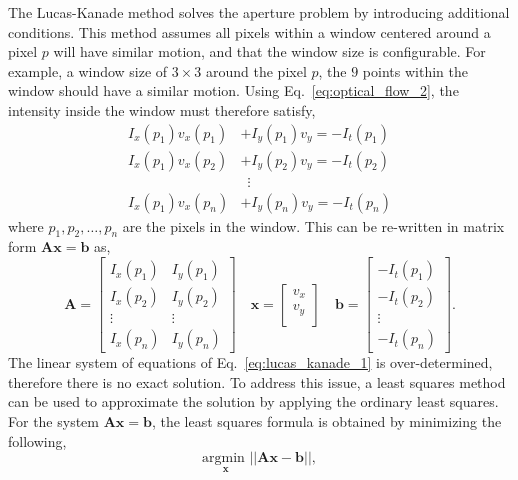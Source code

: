 The Lucas-Kanade method solves the aperture problem by introducing additional
conditions. This method assumes all pixels within a window centered around a
pixel $p$ will have similar motion, and that the window size is configurable.
For example, a window size of $3 \times 3$ around the pixel $p$, the $9$ points
within the window should have a similar motion. Using
Eq.~\ref{eq:optical_flow_2}, the intensity inside the window must therefore
satisfy,
%
\begin{align}
  I_{x}(p_1) v_{x}(p_1) &+ I_{y}(p_1) v_y = -I_{t}(p_1) \nonumber \\
  I_{x}(p_1) v_{x}(p_2) &+ I_{y}(p_2) v_y = -I_{t}(p_2) \nonumber \\
  & \enspace \vdots \nonumber \\
  I_{x}(p_1) v_{x}(p_n) &+ I_{y}(p_n) v_y = -I_{t}(p_n) \nonumber
\end{align}
%
where $p_{1}, p_{2} ,\dots , p_{n}$ are the pixels in the window. This can be
re-written in matrix form $\mathbf{A} \mathbf{x} = \mathbf{b}$ as,
%
\begin{equation}
  \label{eq:lucas_kanade_1}
    \mathbf{A} = \begin{bmatrix}
        I_{x}(p_{1}) & I_{y}(p_{1}) \\
        I_{x}(p_{2}) & I_{y}(p_{2}) \\
        \vdots & \vdots \\
        I_{x}(p_{n}) & I_{y}(p_{n})
    \end{bmatrix}
    \quad
    \mathbf{x} = \begin{bmatrix}
      v_{x} \\ v_{y} \\
    \end{bmatrix}
    \quad
    \mathbf{b} = \begin{bmatrix}
      -I_{t}(p_{1}) \\
      -I_{t}(p_{2}) \\
      \vdots \\
      -I_{t}(p_{n})
    \end{bmatrix}.
\end{equation}
%
The linear system of equations of Eq.~\ref{eq:lucas_kanade_1} is
over-determined, therefore there is no exact solution. To address this issue, a
least squares method can be used to approximate the solution by applying the
ordinary least squares. For the system $\mathbf{A} \mathbf{x} = \mathbf{b}$,
the least squares formula is obtained by minimizing the following,
%
\begin{equation}
  \underset{\mathbf{x}}{\text{argmin }} || \mathbf{A} \mathbf{x} - \mathbf{b} ||,
\end{equation}

